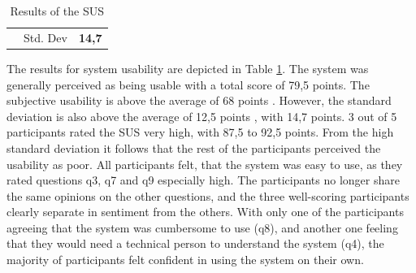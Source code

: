 \begin{table}[ht]
\begin{tabular}{llllllllllll}
    \rowcolor[HTML]{FFFFFF} 
                         & \multicolumn{10}{r}{\cellcolor[HTML]{FFFFFF}Std. Dev}                                                                                      & \textbf{14,7}      \\
    \end{tabular}
    \caption{Results of the SUS}
    \label{tab::sus}
\end{table}

The results for system usability are depicted in Table \ref{tab::sus}.
The system was generally perceived as being usable with a total
score of 79,5 points. The subjective usability is above the
average of 68 points \cite{sauro2016quantifying}.
However, the standard deviation is also above the average of 
12,5 points \cite{sauro2016quantifying}, with 14,7 points.
3 out of 5 participants rated the SUS very high,
with 87,5 to 92,5 points. 
From the high standard deviation it follows that the rest of the 
participants perceived the usability as poor. 
All participants felt, that the system was easy to use,
as they rated questions q3, q7 and q9 especially high.
The participants no longer share the same opinions on the other questions, 
and the three well-scoring participants clearly separate 
in sentiment from the others.
With only one of the participants agreeing that the system
was cumbersome to use (q8), and another one feeling that they
would need a technical person to understand the system (q4),
the majority of participants felt confident in using the system on their own.


